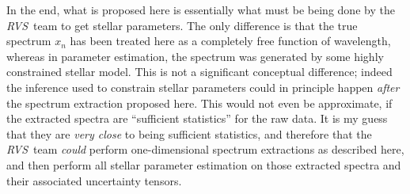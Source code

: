 \documentclass[11pt]{article}
\newcommand{\instrument}[1]{\textsl{#1}}
\newcommand{\RVS}{\instrument{RVS}}
\begin{document}
In the end, what is proposed here is essentially what must be being
done by the \RVS\ team to get stellar parameters.
The only difference is that the true spectrum $x_n$ has been treated
here as a completely free function of wavelength, whereas in parameter
estimation, the spectrum was generated by some highly constrained
stellar model.
This is not a significant conceptual difference; indeed the inference
used to constrain stellar parameters could in principle happen
\emph{after} the spectrum extraction proposed here.
This would not even be approximate, if the extracted spectra are
``sufficient statistics'' for the raw data.
It is my guess that they are \emph{very close} to being sufficient
statistics, and therefore that the \RVS\ team \emph{could} perform
one-dimensional spectrum extractions as described here, and then
perform all stellar parameter estimation on those extracted spectra
and their associated uncertainty tensors.
\end{document}
